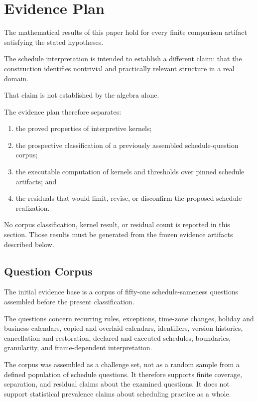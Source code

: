 \documentclass[11pt]{article}
\theoremstyle{plain}
\theoremstyle{definition}
\theoremstyle{remark}
\begin{document}
\section{Evidence Plan}
\label{ik.sec.evidence-plan}

The mathematical results of this paper
hold for every finite comparison artifact
satisfying the stated hypotheses.

The schedule interpretation is intended to establish a different claim:
that the construction identifies nontrivial and practically relevant structure
in a real domain.

That claim is not established by the algebra alone.

The evidence plan therefore separates:

\begin{enumerate}[label=(\alph*)]
  \item the proved properties
        of interpretive kernels;
  \item the prospective classification
        of a previously assembled schedule-question corpus;
  \item the executable computation of kernels and thresholds
        over pinned schedule artifacts; and
  \item the residuals that would limit, revise,
        or disconfirm the proposed schedule realization.
\end{enumerate}

No corpus classification, kernel result, or residual count is reported in this section.
Those results must be generated from the frozen evidence artifacts
described below.

\subsection{Question Corpus}

The initial evidence base is
a corpus of fifty-one schedule-sameness questions
assembled before the present classification.

The questions concern recurring rules,
exceptions,
time-zone changes,
holiday and business calendars,
copied and overlaid calendars,
identifiers,
version histories,
cancellation and restoration,
declared and executed schedules,
boundaries,
granularity,
and frame-dependent interpretation.

The corpus was assembled as a challenge set,
not as a random sample
from a defined population of schedule questions.
It therefore supports
finite coverage,
separation,
and residual claims
about the examined questions.
It does not support
statistical prevalence claims
about scheduling practice as a whole.
\end{document}
